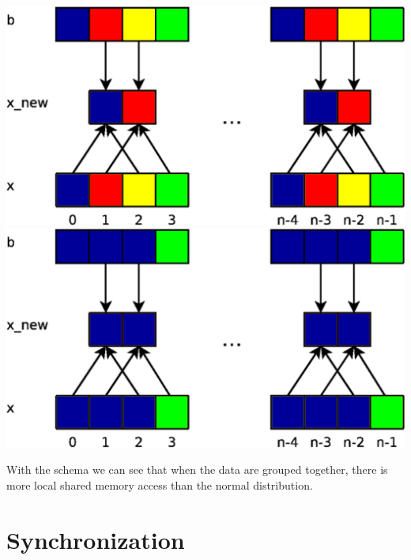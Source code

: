\documentclass{report}
\begin{document}
\begin{center}
    \includegraphics[scale=0.070]{Images/Laplace_unoptimized_da.png}
    \label{fig4}
    \includegraphics[scale=0.070]{Images/Lapalce_optmized_data.png}
    \label{fig5}
\end{center}

With the schema we can see that when the data are grouped together, there is more local shared memory access than the normal distribution.

\section{Synchronization}
\end{document}
